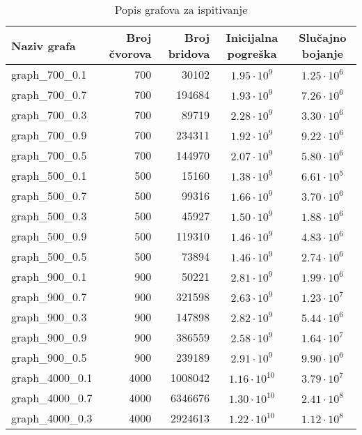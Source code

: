 \documentclass[times, utf8, diplomski, numeric]{fer}
\begin{document}
\begin{table}[htb]
	\caption{Popis grafova za ispitivanje}
	\label{tbl:random-test}
	\centering
	\begin{tabular}{|l|r|r|c|c|} \hline
	Naziv grafa & Broj čvorova & Broj bridova & Inicijalna pogreška & Slučajno bojanje\\ \hline \hline
		graph\_700\_0.1 & 700 & 30102 & $1.95\cdot 10^{9}$ &$1.25\cdot 10^{6}$ \\ \hline 
		graph\_700\_0.7 & 700 & 194684 & $1.93\cdot 10^{9}$ &$7.26\cdot 10^{6}$ \\ \hline 
		graph\_700\_0.3 & 700 & 89719 & $2.28\cdot 10^{9}$ &$3.30\cdot 10^{6}$ \\ \hline 
		graph\_700\_0.9 & 700 & 234311 & $1.92\cdot 10^{9}$ &$9.22\cdot 10^{6}$ \\ \hline 
		graph\_700\_0.5 & 700 & 144970 & $2.07\cdot 10^{9}$ &$5.80\cdot 10^{6}$ \\ \hline 
		graph\_500\_0.1 & 500 & 15160 & $1.38\cdot 10^{9}$ &$6.61\cdot 10^{5}$ \\ \hline 
		graph\_500\_0.7 & 500 & 99316 & $1.66\cdot 10^{9}$ &$3.70\cdot 10^{6}$ \\ \hline 
		graph\_500\_0.3 & 500 & 45927 & $1.50\cdot 10^{9}$ &$1.88\cdot 10^{6}$ \\ \hline 
		graph\_500\_0.9 & 500 & 119310 & $1.46\cdot 10^{9}$ &$4.83\cdot 10^{6}$ \\ \hline 
		graph\_500\_0.5 & 500 & 73894 & $1.46\cdot 10^{9}$ &$2.74\cdot 10^{6}$ \\ \hline 
		graph\_900\_0.1 & 900 & 50221 & $2.81\cdot 10^{9}$ &$1.99\cdot 10^{6}$ \\ \hline 
		graph\_900\_0.7 & 900 & 321598 & $2.63\cdot 10^{9}$ &$1.23\cdot 10^{7}$ \\ \hline 
		graph\_900\_0.3 & 900 & 147898 & $2.82\cdot 10^{9}$ &$5.44\cdot 10^{6}$ \\ \hline 
		graph\_900\_0.9 & 900 & 386559 & $2.58\cdot 10^{9}$ &$1.64\cdot 10^{7}$ \\ \hline 
		graph\_900\_0.5 & 900 & 239189 & $2.91\cdot 10^{9}$ &$9.90\cdot 10^{6}$ \\ \hline 
		graph\_4000\_0.1 & 4000 & 1008042 & $1.16\cdot 10^{10}$ &$3.79\cdot 10^{7}$ \\ \hline 
		graph\_4000\_0.7 & 4000 & 6346676 & $1.30\cdot 10^{10}$ &$2.41\cdot 10^{8}$ \\ \hline 
		graph\_4000\_0.3 & 4000 & 2924613 & $1.22\cdot 10^{10}$ &$1.12\cdot 10^{8}$ \\ \hline 

\end{tabular}
\end{table}
\end{document}
